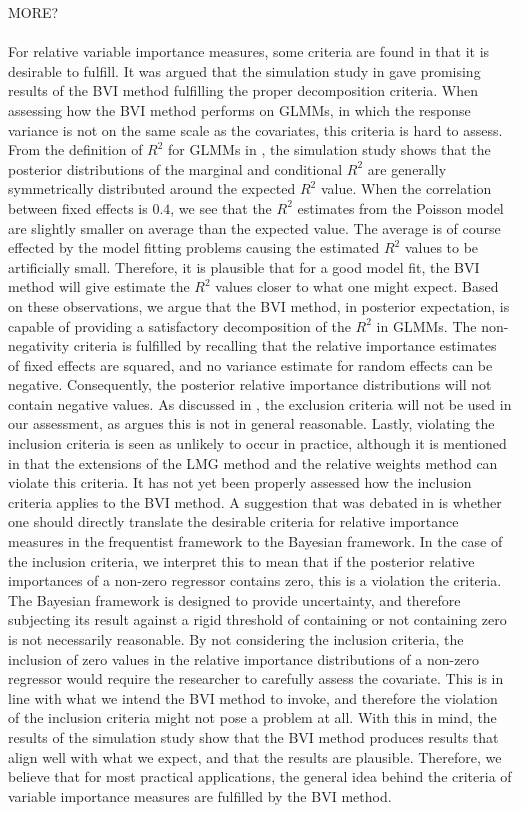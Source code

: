 MORE?
\\
\\
For relative variable importance measures, some criteria are found in  that it is desirable to fulfill. It was argued that the simulation study in \citet{Arnstad} gave promising results of the BVI method fulfilling the proper decomposition criteria. When assessing how the BVI method performs on GLMMs, in which the response variance is not on the same scale as the covariates, this criteria is hard to assess. From the definition of $R^2$ for GLMMs in \citet{nakagawa2013general}, the simulation study shows that the posterior distributions of the marginal and conditional $R^2$ are generally symmetrically distributed around the expected $R^2$ value. When the correlation between fixed effects is $0.4$, we see that the $R^2$ estimates from the Poisson model are slightly smaller on average than the expected value. The average is of course effected by the model fitting problems causing the estimated $R^2$ values to be artificially small. Therefore, it is plausible that for a good model fit, the BVI method will give estimate the $R^2$ values closer to what one might expect. Based on these observations, we argue that the BVI method, in posterior expectation, is capable of providing a satisfactory decomposition of the $R^2$ in GLMMs. The non-negativity criteria is fulfilled by recalling that the relative importance estimates of fixed effects are squared, and no variance estimate for random effects can be negative. Consequently, the posterior relative importance distributions will not contain negative values. As discussed in \citet{Arnstad}, the exclusion criteria will not be used in our assessment, as \citet{gromping_relaimpo} argues this is not in general reasonable. Lastly, violating  the inclusion criteria is seen as unlikely to occur in practice, although it is mentioned in \citet{matre} that the extensions of the LMG method and the relative weights method can violate this criteria. It has not yet been properly assessed how the inclusion criteria applies to the BVI method. A suggestion that was debated in \citep{Arnstad} is whether one should directly translate the desirable criteria for relative importance measures in the frequentist framework to the Bayesian framework. In the case of the inclusion criteria, we interpret this to mean that if the posterior relative importances of a non-zero regressor contains zero, this is a violation the criteria. The Bayesian framework is designed to provide uncertainty, and therefore subjecting its result against a rigid threshold of containing or not containing zero is not necessarily reasonable. By not considering the inclusion criteria, the inclusion of zero values in the relative importance distributions of a non-zero regressor would require the researcher to carefully assess the covariate. This is in line with what we intend the BVI method to invoke, and therefore the violation of the inclusion criteria might not pose a problem at all. With this in mind, the results of the simulation study show that the BVI method produces results that align well with what we expect, and that the results are plausible. Therefore, we believe that for most practical applications, the general idea behind the criteria of variable importance measures are fulfilled by the BVI method. 

